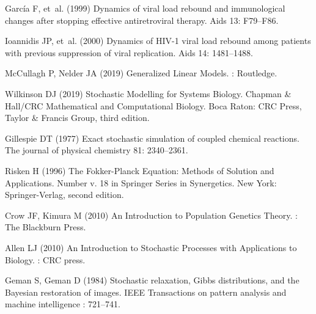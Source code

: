 \documentclass[11pt]{article}
\begin{document}
{\begin{thebibliography}{10}
Garc{\'i}a F, et~al. (1999) Dynamics of viral load rebound and immunological
  changes after stopping effective antiretroviral therapy.
\newblock Aids 13: F79--F86.

Ioannidis JP, et~al. (2000) Dynamics of {{HIV}}-1 viral load rebound among
  patients with previous suppression of viral replication.
\newblock Aids 14: 1481--1488.

McCullagh P, Nelder JA (2019) Generalized Linear Models.
: {Routledge}.

Wilkinson DJ (2019) Stochastic Modelling for Systems Biology.
\newblock Chapman \& {{Hall}}/{{CRC}} Mathematical and Computational Biology.
  {Boca Raton}: {CRC Press, Taylor \& Francis Group}, third edition.

Gillespie DT (1977) Exact stochastic simulation of coupled chemical reactions.
\newblock The journal of physical chemistry 81: 2340--2361.

Risken H (1996) The {{Fokker}}-{{Planck}} Equation: Methods of Solution and
  Applications.
\newblock Number v. 18 in Springer Series in Synergetics. {New York}:
  {Springer-Verlag}, second edition.

Crow JF, Kimura M (2010) An Introduction to Population Genetics Theory.
: {The Blackburn Press}.

Allen LJ (2010) An Introduction to Stochastic Processes with Applications to
  Biology.
: {CRC press}.

Geman S, Geman D (1984) Stochastic relaxation, {{Gibbs}} distributions, and the
  {{Bayesian}} restoration of images.
\newblock IEEE Transactions on pattern analysis and machine intelligence :
  721--741.


\end{thebibliography}}
\end{document}
